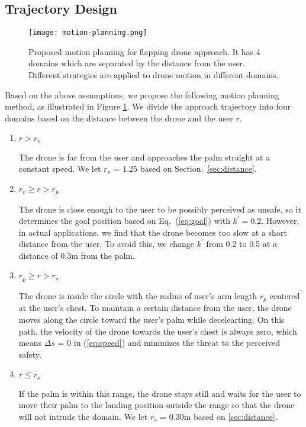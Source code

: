 \subsection{Trajectory Design}
\label{sec:trajectory}

\begin{figure}[t]
    \centering
    \texttt{[image: motion-planning.png]}
    \caption{Proposed motion planning for flapping drone approach. It has 4 domains which are separated by the distance from the user. Different strategies are applied to drone motion in different domains.
    }
    \label{fig:trajectory}
\end{figure}

Based on the above assumptions, we propose the following motion planning method, as illustrated in Figure \ref{fig:trajectory}.
We divide the approach trajectory into four domains based on the distance between the drone and the user $r$.

\begin{enumerate}
    \item $r > r_v$
    
    The drone is far from the user and approaches the palm straight at a constant speed.
    We let $r_v$ = 1.25 based on Section.~\ref{sec:distance}.

    \item $r_v \geq r > r_p$
    
    The drone is close enough to the user to be possibly perceived as unsafe, 
    so it determines the goal position based on Eq.~(\ref{eq:goal}) with $k^\prime = 0.2$.
    However, in actual applications, we find that the drone becomes too slow at a short distance from the user.
    To avoid this, we change $k^\prime$ from 0.2 to 0.5 at a distance of 0.3m from the palm.

    \item $r_p \geq r > r_s$
    
    The drone is inside the circle with the radius of user's arm length $r_p$ centered at the user's chest.
    To maintain a certain distance from the user, the drone moves along the circle toward the user's palm while decelearting.
    On this path, the velocity of the drone towards the user's chest is always zero,
    which means $\Delta s$ = 0 in (\ref{eq:speed}) and minimizes the threat to the perceived safety.

    \item $r \leq r_s$
    \label{sec:innermost}
    
    If the palm is within this range, the drone stays still and waits for the user to move their palm to the landing position outside the range so that the drone will not intrude the domain.
    We let $r_s$ = 0.30m based on \ref{sec:distance}.

\end{enumerate}